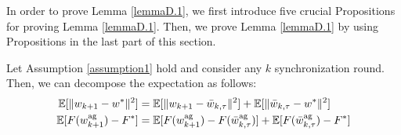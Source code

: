 
In order to prove Lemma \ref{lemmaD.1}, we first introduce five crucial Propositions for proving Lemma \ref{lemmaD.1}. Then, we prove Lemma \ref{lemmaD.1} by using Propositions in the last part of this section.
\begin{proposition} \label{propositionD.2}
Let Assumption \ref{assumption1} hold and consider any $k$ synchronization round. Then, we can decompose the expectation as follows:
\begin{align*}
    \mathbb{E}[\|w_{k+1} - w^*\|^2] &= \mathbb{E}[\|w_{k+1} - \Bar{w}_{k, \tau}\|^2] + \mathbb{E}[\|\Bar{w}_{k, \tau} - w^*\|^2] \\
    \mathbb{E}[F(w_{k+1}^{\textrm{ag}}) - F^*] &= \mathbb{E}[F(w_{k+1}^{\textrm{ag}}) - F(\Bar{w}_{k, \tau}^{\textrm{ag}})] + \mathbb{E}[F(\Bar{w}_{k, \tau}^{\textrm{ag}}) - F^*]
\end{align*}
\end{proposition}

